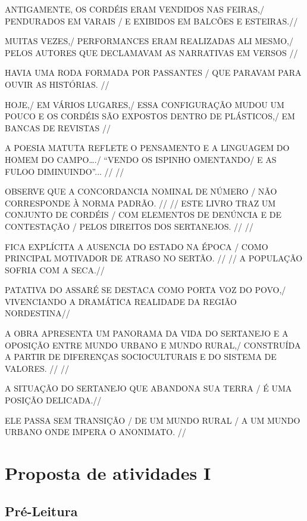 \documentclass[12pt]{extarticle}
\begin{document}
ANTIGAMENTE, OS CORDÉIS ERAM VENDIDOS NAS FEIRAS,/ PENDURADOS EM VARAIS / E EXIBIDOS EM BALCÕES E ESTEIRAS.//
 
MUITAS VEZES,/ PERFORMANCES ERAM REALIZADAS ALI MESMO,/ PELOS AUTORES QUE DECLAMAVAM AS NARRATIVAS EM VERSOS //
 
HAVIA UMA RODA FORMADA POR PASSANTES / QUE PARAVAM PARA OUVIR AS HISTÓRIAS. //
 
HOJE,/ EM VÁRIOS LUGARES,/ ESSA CONFIGURAÇÃO MUDOU UM POUCO E OS CORDÉIS SÃO EXPOSTOS DENTRO DE PLÁSTICOS,/ EM BANCAS DE REVISTAS //
 
A POESIA MATUTA REFLETE O PENSAMENTO E A LINGUAGEM DO HOMEM DO CAMPO…./       “VENDO OS ISPINHO OMENTANDO/ E AS FULOO DIMINUINDO”... //
//
 
OBSERVE QUE A CONCORDANCIA NOMINAL DE NÚMERO / NÃO CORRESPONDE À NORMA PADRÃO. //
//
ESTE LIVRO TRAZ UM CONJUNTO DE CORDÉIS / COM ELEMENTOS DE DENÚNCIA E DE CONTESTAÇÃO / PELOS DIREITOS DOS SERTANEJOS. //
//
 
FICA EXPLÍCITA A AUSENCIA DO ESTADO NA ÉPOCA / COMO PRINCIPAL MOTIVADOR DE ATRASO NO SERTÃO. //
//
A POPULAÇÃO SOFRIA COM A SECA.// 

PATATIVA DO ASSARÉ SE DESTACA COMO PORTA VOZ DO POVO,/ VIVENCIANDO A DRAMÁTICA REALIDADE DA REGIÃO NORDESTINA//
 
A OBRA APRESENTA UM PANORAMA DA VIDA DO SERTANEJO E A OPOSIÇÃO ENTRE MUNDO URBANO E MUNDO RURAL,/ CONSTRUÍDA A PARTIR DE DIFERENÇAS SOCIOCULTURAIS E DO SISTEMA DE VALORES. //
//
 
A SITUAÇÃO DO SERTANEJO QUE ABANDONA SUA TERRA / É UMA POSIÇÃO DELICADA.//

ELE PASSA SEM TRANSIÇÃO / DE UM MUNDO RURAL / A UM MUNDO URBANO ONDE IMPERA O ANONIMATO. //


\section{Proposta de atividades I}

\subsection{Pré-Leitura}
\end{document}
